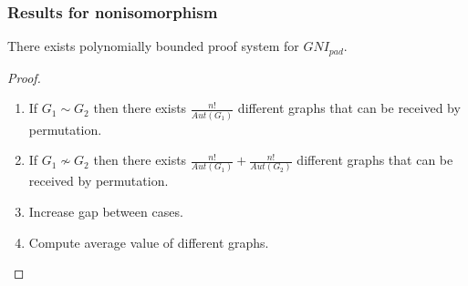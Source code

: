 \begin{frame}
    \frametitle{Results for nonisomorphism}

    \begin{theorem}
        There exists polynomially bounded proof system for $GNI_{pad}$.
    \end{theorem}

    \begin{proof}
        \begin{enumerate}
	        \item If $G_1 \sim G_2$ then there exists $\frac{n!}{Aut(G_1)}$ different
		        graphs that can be received by permutation.
            \item If $G_1 \nsim G_2$ then there exists $\frac{n!}{Aut(G_1)} +
		        \frac{n!}{Aut(G_2)}$ different graphs that can be received by permutation.
            \item Increase gap between cases.
        	\item Compute average value of different graphs.
        \end{enumerate}
    \end{proof}
\end{frame}